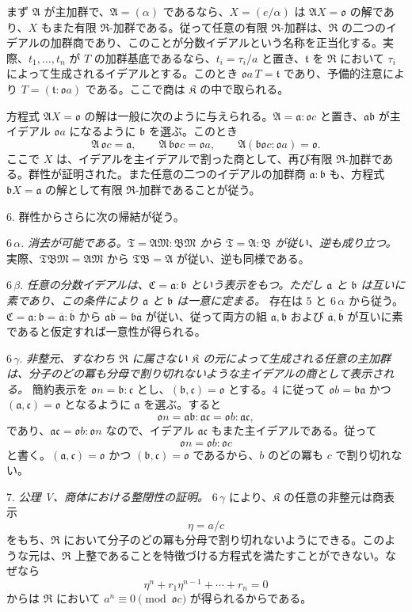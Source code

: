 \documentclass[11pt]{article}
\providecommand{\mR}{\mathfrak{R}}
\providecommand{\mK}{\mathfrak{K}}
\providecommand{\mbar}[1]{\overline{#1}}
\providecommand{\ma}{\mathfrak{a}}
\providecommand{\mb}{\mathfrak{b}}
\providecommand{\mc}{\mathfrak{c}}
\providecommand{\mo}{\mathfrak{o}}
\providecommand{\mt}{\mathfrak{t}}
\begin{document}
まず $\mathfrak A$ が主加群で、$\mathfrak A=(\alpha)$ であるなら、$X=(e/\alpha)$ は $\mathfrak A X=\mo$ の解であり、$X$ もまた有限 $\mR$-加群である。従って任意の有限 $\mR$-加群は、$\mR$ の二つのイデアルの加群商であり、このことが分数イデアルという名称を正当化する。実際、$t_1,\ldots,t_n$ が $T$ の加群基底であるなら、$t_i=\tau_i/a$ と置き、$\mt$ を $\mR$ において $\tau_i$ によって生成されるイデアルとする。このとき $\mo a\,T=\mt$ であり、予備的注意により $T=(\mt:\mo a)$ である。ここで商は $\mK$ の中で取られる。

方程式 $\mathfrak A X=\mo$ の解は一般に次のように与えられる。$\mathfrak A=\ma:\mo c$ と置き、$\ma\mb$ が主イデアル $\mo a$ になるように $\mb$ を選ぶ。このとき
\[
        \mathfrak A\,\mo c=\ma,
        \qquad \mathfrak A\,\mb\mo c=\mo a,
        \qquad \mathfrak A(\mb\mo c:\mo a)=\mo.
\]
ここで $X$ は、イデアルを主イデアルで割った商として、再び有限 $\mR$-加群である。群性が証明された。また任意の二つのイデアルの加群商 $\ma:\mb$ も、方程式 $\mb X=\ma$ の解として有限 $\mR$-加群であることが従う。

6. 群性からさらに次の帰結が従う。

6\,$\alpha$. \emph{消去が可能である。$\mathfrak T=\mathfrak A\mathfrak M:\mathfrak B\mathfrak M$ から $\mathfrak T=\mathfrak A:\mathfrak B$ が従い、逆も成り立つ。} 実際、$\mathfrak T\mathfrak B\mathfrak M=\mathfrak A\mathfrak M$ から $\mathfrak T\mathfrak B=\mathfrak A$ が従い、逆も同様である。

6\,$\beta$. \emph{任意の分数イデアルは、$\mathfrak C=\ma:\mb$ という表示をもつ。ただし $\ma$ と $\mb$ は互いに素であり、この条件により $\ma$ と $\mb$ は一意に定まる。} 存在は 5 と 6\,$\alpha$ から従う。$\mathfrak C=\ma:\mb=\mbar\ma:\mbar\mb$ から $\ma\mbar\mb=\mb\mbar\ma$ が従い、従って両方の組 $\ma,\mb$ および $\mbar\ma,\mbar\mb$ が互いに素であると仮定すれば一意性が得られる。

6\,$\gamma$. \emph{非整元、すなわち $\mR$ に属さない $\mK$ の元によって生成される任意の主加群は、分子のどの冪も分母で割り切れないような主イデアルの商として表示される。} 簡約表示を $\mo n=\mb:\mc$ とし、$(\mb,\mc)=\mo$ とする。4 に従って $\mo b=\mb\ma$ かつ $(\ma,\mc)=\mo$ となるように $\ma$ を選ぶ。すると
\[
        \mo n=\ma\mb:\ma\mc=\mo b:\ma\mc,
\]
であり、$\ma\mc=\mo b:\mo n$ なので、イデアル $\ma\mc$ もまた主イデアルである。従って
\[
        \mo n=\mo b:\mo c
\]
と書く。$(\ma,\mc)=\mo$ かつ $(\mb,\mc)=\mo$ であるから、$b$ のどの冪も $c$ で割り切れない。

7. \emph{公理 V、商体における整閉性の証明。} 6\,$\gamma$ により、$\mK$ の任意の非整元は商表示
\[
        \eta=a/c
\]
をもち、$\mR$ において分子のどの冪も分母で割り切れないようにできる。このような元は、$\mR$ 上整であることを特徴づける方程式を満たすことができない。なぜなら
\[
        \eta^n+r_1\eta^{n-1}+\cdots+r_n=0
\]
からは $\mR$ において $a^n\equiv0\pmod{\mo c}$ が得られるからである。
\end{document}

